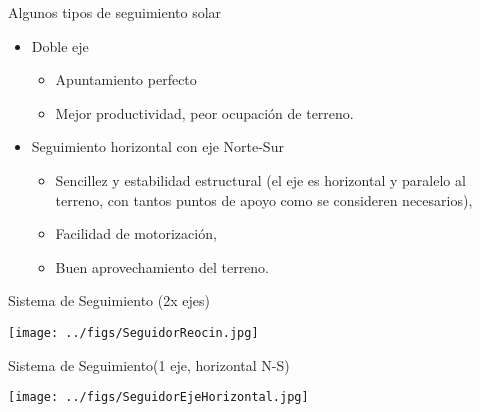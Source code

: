 \documentclass[aspectratio=169, usenames,svgnames,dvipsnames]{beamer}
\begin{document}
\begin{frame}[label={sec:org2300d48}]{Algunos tipos de seguimiento solar}
\begin{itemize}
\item \alert{Doble eje}

\begin{itemize}
\item Apuntamiento \guillemotleft{}perfecto\guillemotright{}

\item Mejor productividad, peor ocupación de terreno.
\end{itemize}
\end{itemize}


\begin{itemize}
\item \alert{Seguimiento horizontal con eje Norte-Sur}

\begin{itemize}
\item Sencillez y estabilidad estructural (el eje es horizontal y
paralelo al terreno, con tantos puntos de apoyo como se consideren
necesarios),

\item Facilidad de motorización,

\item Buen aprovechamiento del terreno.
\end{itemize}
\end{itemize}
\end{frame}

\begin{frame}[label={sec:org9533494}]{Sistema de Seguimiento (2x ejes)}
\begin{center}
\texttt{[image: ../figs/SeguidorReocin.jpg]}
\end{center}
\end{frame}

\begin{frame}[label={sec:orgb00a17b}]{Sistema de Seguimiento(1 eje, horizontal N-S)}
\begin{center}
\texttt{[image: ../figs/SeguidorEjeHorizontal.jpg]}
\end{center}
\end{frame}
\end{document}
